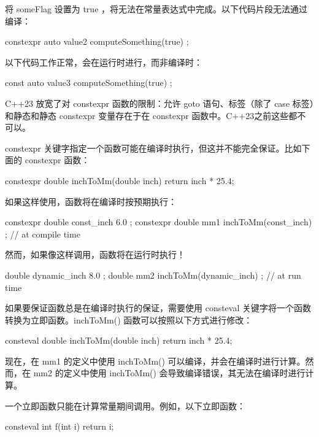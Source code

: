 将 someFlag 设置为 true ，将无法在常量表达式中完成。以下代码片段无法通过编译：

\begin{cpp}
constexpr auto value2 { computeSomething(true) };
\end{cpp}

以下代码工作正常，会在运行时进行，而非编译时：

\begin{cpp}
const auto value3 { computeSomething(true) };
\end{cpp}


C++23 放宽了对 constexpr 函数的限制：允许 goto 语句、标签（除了 case 标签）和静态和静态 constexpr 变量存在于在 constexpr 函数中。C++23之前这些都不可以。


constexpr 关键字指定一个函数可能在编译时执行，但这并不能完全保证。比如下面的 constexpr 函数：

\begin{cpp}
constexpr double inchToMm(double inch) { return inch * 25.4; }
\end{cpp}

如果这样使用，函数将在编译时按预期执行：

\begin{cpp}
constexpr double const_inch { 6.0 };
constexpr double mm1 { inchToMm(const_inch) }; // at compile time
\end{cpp}

然而，如果像这样调用，函数将在运行时执行！

\begin{cpp}
double dynamic_inch { 8.0 };
double mm2 { inchToMm(dynamic_inch) }; // at run time
\end{cpp}

如果要保证函数总是在编译时执行的保证，需要使用 consteval 关键字将一个函数转换为立即函数。inchToMm() 函数可以按照以下方式进行修改：

\begin{cpp}
consteval double inchToMm(double inch) { return inch * 25.4; }
\end{cpp}

现在，在 mm1 的定义中使用 inchToMm() 可以编译，并会在编译时进行计算。然而，在 mm2 的定义中使用 inchToMm() 会导致编译错误，其无法在编译时进行计算。

一个立即函数只能在计算常量期间调用。例如，以下立即函数：

\begin{cpp}
consteval int f(int i) { return i; }
\end{cpp}

